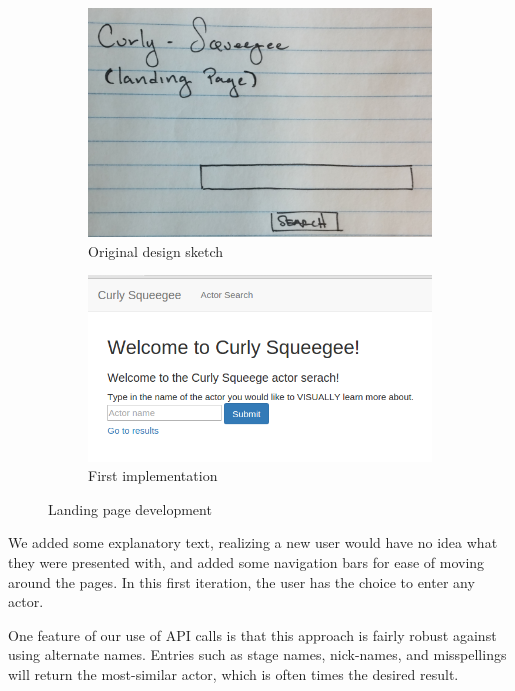 \documentclass[12pt]{article}
\begin{document}
	\begin{figure}[h!]
		\centering
		\begin{subfigure}[t]{.5\textwidth}
			  \centering
			  \includegraphics[width=\linewidth]{images/landingPage_crop.png}
			  \caption{Original design sketch}
			  \label{fig:sub1}
		\end{subfigure}%
		\begin{subfigure}[t]{.8\textwidth}
			  \centering
			  \includegraphics[width=0.75\linewidth]{images/landingPage.png}
			  \caption{First implementation}
			  \label{fig:sub2}
		\end{subfigure}%
		\caption{Landing page development}
		\label{fig:landingPage}
	\end{figure}


 


We added some explanatory text, realizing a new user would have no idea what they were presented with, and added some navigation bars for ease of moving around the pages. In this first iteration, the user has the choice to enter any actor.

One feature of our use of API calls is that this approach is fairly robust against using alternate names.  Entries such as stage names, nick-names, and misspellings will return the most-similar actor, which is often times the desired result.  
\end{document}
